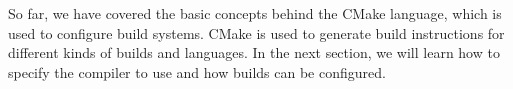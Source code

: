 So far, we have covered the basic concepts behind the CMake language, which is used to configure build systems. CMake is used to generate build instructions for different kinds of builds and languages. In the next section, we will learn how to specify the compiler to use and how builds can be configured.













